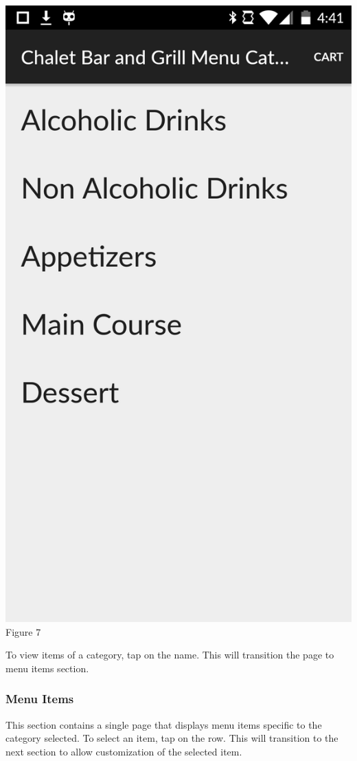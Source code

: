 \documentclass[12pt, titlepage]{article}
\begin{document}
\begin{center}\includegraphics[scale=0.15]{category.png}	\linebreak Figure 7\end{center}

\noindent To view items of a category, tap on the name. This will transition the page to menu items section.

\subsubsection{Menu Items}
This section contains a single page that displays menu items specific to the category selected. To select an item, tap on the row. This will transition to the next section to allow customization of the selected item. 
\end{document}
